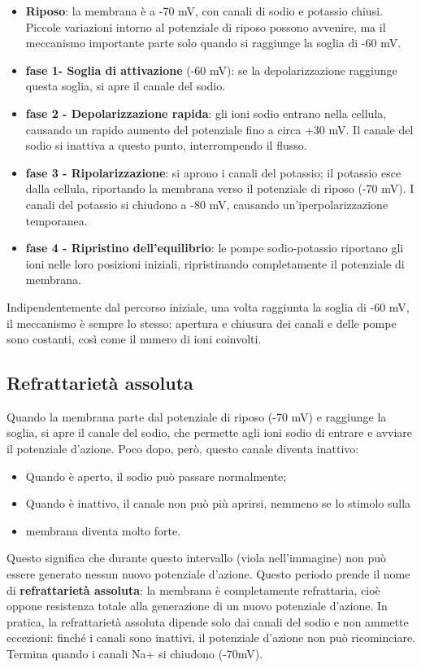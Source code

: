 \begin{itemize}
  \item \textbf{Riposo}: la membrana è a -70 mV, con canali di sodio e potassio chiusi. Piccole variazioni intorno al potenziale di riposo possono avvenire, ma il meccanismo importante parte solo quando si raggiunge la soglia di -60 mV.
  \item \textbf{fase 1- Soglia di attivazione }(-60 mV): se la depolarizzazione raggiunge questa soglia, si apre il canale del sodio.
  \item \textbf{fase 2 - Depolarizzazione rapida}: gli ioni sodio entrano nella cellula, causando un rapido aumento del potenziale fino a circa +30 mV. Il canale del sodio si inattiva a questo punto, interrompendo il flusso.
  \item \textbf{fase 3 - Ripolarizzazione}: si aprono i canali del potassio; il potassio esce dalla cellula, riportando la membrana verso il potenziale di riposo (-70 mV). I canali del potassio si chiudono a -80 mV, causando un'iperpolarizzazione temporanea.
  \item \textbf{fase 4 - Ripristino dell'equilibrio}: le pompe sodio-potassio riportano gli ioni nelle loro posizioni iniziali, ripristinando completamente il potenziale di membrana.
\end{itemize}
Indipendentemente dal percorso iniziale, una volta raggiunta la soglia di -60 mV, il meccanismo è sempre lo stesso: apertura e chiusura dei canali e delle pompe sono costanti, così come il numero di ioni coinvolti.


\subsection{Refrattarietà assoluta}

Quando la membrana parte dal potenziale di riposo (-70 mV) e raggiunge la soglia, si apre il canale del sodio, che permette agli ioni sodio di entrare e avviare il potenziale d'azione. Poco dopo, però, questo canale diventa inattivo:

\begin{itemize}
  \item Quando è aperto, il sodio può passare normalmente;
  \item Quando è inattivo, il canale non può più aprirsi, nemmeno se lo stimolo sulla
  \item membrana diventa molto forte.
\end{itemize}
Questo significa che durante questo intervallo (viola nell'immagine) non può essere generato nessun nuovo potenziale d'azione.
Questo periodo prende il nome di \textbf{refrattarietà assoluta}: la membrana è completamente refrattaria, cioè oppone resistenza totale alla generazione di un nuovo potenziale d'azione.
In pratica, la refrattarietà assoluta dipende solo dai canali del sodio e non ammette eccezioni: finché i canali sono inattivi, il potenziale d'azione non può ricominciare. Termina quando i canali Na+ si chiudono (-70mV).


